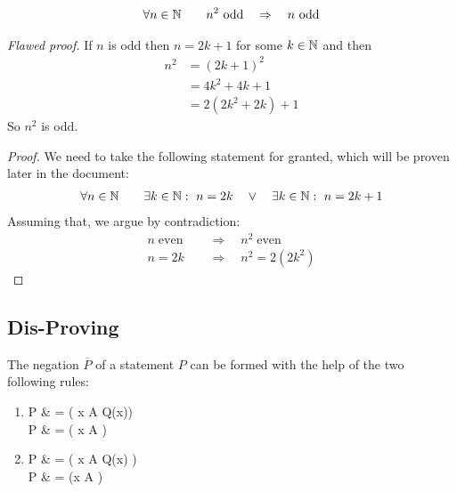 \begin{tm}
	\begin{align*}
	\forall n \in \mathbb N \qquad n^2~\text{odd} \quad \Rightarrow \quad n~\text{odd}
	\end{align*}
\end{tm} 
\emph{Flawed proof.} If $n$ is odd then $n = 2k+1$ for some $k \in \mathbb N$ and then 
\begin{align*}
n^2 & = (2k+1)^2 \\
 & = 4k^2 + 4k +1 \\
 & = 2 \left( 2k^2 +2k \right) +1
\end{align*}
So $n^2$ is odd.
\begin{proof}
We need to take the following statement for granted, which will be proven later in the document:
\begin{align*}
\forall n \in \mathbb N\qquad  \exists k \in \mathbb N: ~ n= 2k \quad \vee \quad \exists k \in \mathbb N: ~ n = 2k+1
\end{align*}
Assuming that, we argue by contradiction:
\begin{align*}
n \operatorname{even} \quad & \Rightarrow \quad n^2 \operatorname{even} \\
n=2k \quad & \Rightarrow \quad n^2 = 2 \left(2k^2 \right)
\end{align*}
\end{proof}




\subsection{Dis-Proving}
The negation $\overline{P}$ of a statement $P$ can be formed with the help of the two following rules:
\begin{enumerate}
	\item 
	\begin{itemal}
	P & = ( \forall x \in A \quad Q(x)) \\
	\Rightarrow \qquad \overline P & = \left( \exists x \in A\quad {} \right)
	\end{itemal}
	\item
	\begin{itemal}
	P & = ( \exists x \in A \quad Q(x) ) \\
	\Rightarrow \qquad \overline P & = \left(\forall x \in A \quad {} \right)
	\end{itemal}
\end{enumerate}

